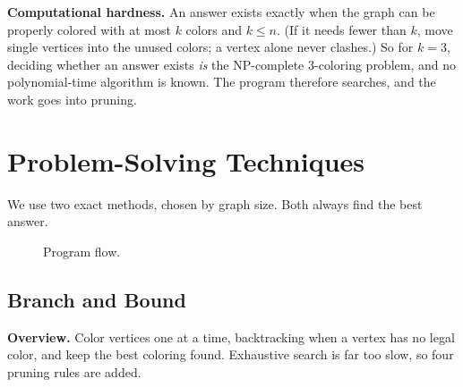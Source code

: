 \documentclass[11pt]{article}
\begin{document}
\textbf{Computational hardness.} An answer exists exactly when the graph
can be properly colored with at most $k$ colors and $k \le n$. (If it needs
fewer than $k$, move single vertices into the unused colors; a vertex alone
never clashes.) So for $k=3$, deciding whether an answer exists \emph{is}
the NP-complete 3-coloring problem, and no polynomial-time algorithm is
known. The program therefore searches, and the work goes into pruning.

\section{Problem-Solving Techniques}\label{sec:techniques}

We use two exact methods, chosen by graph size. Both always find the best
answer.

\begin{figure}[h]
\centering
{}
\caption{Program flow.}
\end{figure}

\subsection{Branch and Bound}

\textbf{Overview.} Color vertices one at a time, backtracking when a vertex
has no legal color, and keep the best coloring found. Exhaustive search is
far too slow, so four pruning rules are added.
\end{document}

